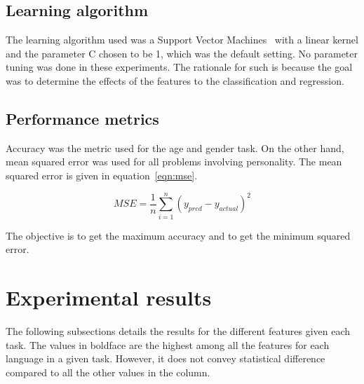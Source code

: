 \documentclass[a4paper]{llncs}
\begin{document}
\subsection{Learning algorithm}
The learning algorithm used was a Support Vector Machines~\cite{cortes1995support} with a linear kernel and the parameter C chosen to be 1, which was the default setting. No parameter tuning was done in these experiments. The rationale for such is because the goal was to determine the effects of the features to the classification and regression.  
\subsection{Performance metrics}
Accuracy was the metric used for the age and gender task. On the other hand, mean squared error was used for all problems involving personality. The mean squared error is given in equation~\ref{eqn:mse}.

\begin{equation}
MSE =\frac{1}{n} \sum_{i=1}^n \left( y_{pred}-y_{actual}\right)^2 
\label{eqn:mse}
\end{equation}


The objective is to get the maximum accuracy and to get the minimum squared error. 
\section{Experimental results}
The following subsections details the results for the different features given each task. The values in boldface are the highest among all the features for each language in a given task. However, it does not convey statistical difference compared to all the other values in the column. 
\end{document}
